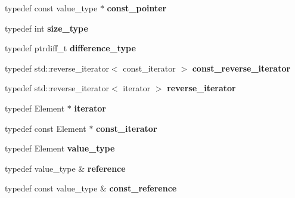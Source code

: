 \begin{DoxyCompactItemize}
typedef const value\+\_\+type $\ast$ {\bfseries const\+\_\+pointer}
\item 
\mbox{\label{classgoogle_1_1protobuf_1_1RepeatedField_aa09f6af062bf523ff6c93deee7d4b04e}} 
typedef int {\bfseries size\+\_\+type}
\item 
\mbox{\label{classgoogle_1_1protobuf_1_1RepeatedField_a23df2e891984dcec89eb18a2875defce}} 
typedef ptrdiff\+\_\+t {\bfseries difference\+\_\+type}
\item 
\mbox{\label{classgoogle_1_1protobuf_1_1RepeatedField_ac4359f48e29260cb4f89c68b7de0844b}} 
typedef std\+::reverse\+\_\+iterator$<$ const\+\_\+iterator $>$ {\bfseries const\+\_\+reverse\+\_\+iterator}
\item 
\mbox{\label{classgoogle_1_1protobuf_1_1RepeatedField_aaff815b4b8157d4763a818fdfa282907}} 
typedef std\+::reverse\+\_\+iterator$<$ iterator $>$ {\bfseries reverse\+\_\+iterator}
\item 
\mbox{\label{classgoogle_1_1protobuf_1_1RepeatedField_afe09465b67f0342d6ce7dc91db798730}} 
typedef Element $\ast$ {\bfseries iterator}
\item 
\mbox{\label{classgoogle_1_1protobuf_1_1RepeatedField_ac1b246f4f6e0f7041b140cda573d91b0}} 
typedef const Element $\ast$ {\bfseries const\+\_\+iterator}
\item 
\mbox{\label{classgoogle_1_1protobuf_1_1RepeatedField_a09797dc6e6bab6af56940342cdd026fb}} 
typedef Element {\bfseries value\+\_\+type}
\item 
\mbox{\label{classgoogle_1_1protobuf_1_1RepeatedField_a74b47a230c833d45e0ee342d3774c8db}} 
typedef value\+\_\+type \& {\bfseries reference}
\item 
\mbox{\label{classgoogle_1_1protobuf_1_1RepeatedField_a859f4eb9df20e25721f12243d25ef1ef}} 
typedef const value\+\_\+type \& {\bfseries const\+\_\+reference}

\end{DoxyCompactItemize}
